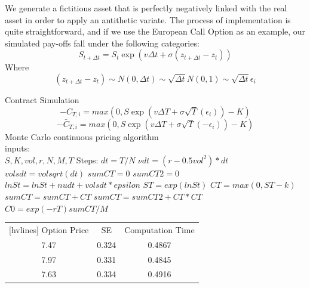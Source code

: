 \noindent We generate a fictitious asset that is perfectly negatively linked with the real asset in order to apply an antithetic variate. The process of implementation is quite straightforward, and if we use the European Call Option as an example, our simulated pay-offs fall under the following categories: 
$$S_{t+\Delta t}=S_{t}\exp(v\Delta t+\sigma(z_{t+\Delta t}-z_{t}))$$
Where
$$(z_{t+\Delta t}-z_{t}) \sim N(0,\Delta t)\sim \sqrt{\Delta t}N(0,1) \sim \sqrt{\Delta t}\epsilon_{i}$$

\noindent Contract Simulation
$$-C_{T,i}=max(0,S \exp(v\Delta T+\sigma\sqrt{T}(\epsilon_{i}))-K)$$
$$-\bar{C}_{T,i}=max(0,S \exp(v\Delta T+\sigma\sqrt{T}(-\epsilon_{i}))-K)$$
\noindent Monte Carlo continuous pricing algorithm\\
inputs:  \\
$S, K, vol, r, N, M, T$ \newline
Steps:
$dt=T/N$ \newline
$\nu dt=(r-0.5vol^2)*dt$  \newline
$volsdt=volsqrt(dt)$  \newline
$sumCT=0$  \newline
$sumCT2=0$  \newline
\indent $lnSt=lnSt+nudt+volsdt*epsilon$  \newline
\indent $ST=exp(lnSt)$  \newline
\indent $CT=max(0,ST-k)$  \newline
\indent $sumCT=sumCT+CT$  \newline
\indent $sumCT=sumCT2+CT*CT$  \newline
$C0=exp(-rT)sumCT/M$  \newline
{}

\begin{center}
\begin{NiceTabular}{|c|c|c|}[hvlines]
	 Option Price & SE & Computation Time\\ 
	7.47 & 0.324 & 0.4867\\ 
	7.97 & 0.331 & 0.4845\\
	7.63 & 0.334 & 0.4916\\
\end{NiceTabular}
\end{center}


